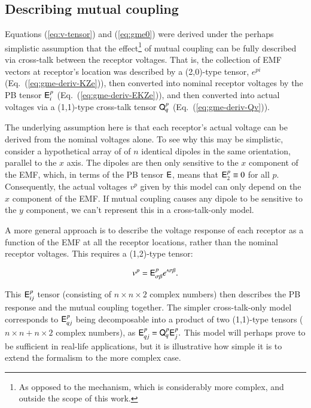\documentclass[]{aa}
\begin{document}
\subsection{Describing mutual coupling}

Equations (\ref{eq:v-tensor}) and (\ref{eq:gme0}) were derived under the perhaps simplistic assumption that the effect\footnote{As opposed
to the mechanism, which is considerably more complex, and outside the scope of this work.} of mutual coupling can be fully described via cross-talk between the receptor voltages. That is, the collection of EMF vectors at receptor's location was described by a (2,0)-type tensor, $e^{pi}$ (Eq.~(\ref{eq:gme-deriv-KZe})), then converted into nominal receptor voltages by the PB tensor $\mathsf{E}^p_i$ (Eq.~(\ref{eq:gme-deriv-EKZe})), and then converted into actual voltages via a (1,1)-type cross-talk tensor $\mathsf{Q}^p_q$ (Eq.~(\ref{eq:gme-deriv-Qv})).

The underlying assumption here is that each receptor's actual voltage can be derived from the nominal voltages alone. To see why this may
be simplistic, consider a hypothetical array of of $n$ identical dipoles in the same orientation, parallel to the
$x$ axis. The dipoles are then only sensitive to the $x$ component of the EMF, which, in terms of the PB tensor $\mathsf{E}$, means that
$\mathsf{E}_{2}^{p}\equiv0$ for all $p$. Consequently, the actual voltages $v^{p}$ given by this model can only depend on the $x$ component of the EMF.
If mutual coupling causes any dipole to be sensitive to the $y$ component, we can't represent this in a cross-talk-only model.

A more general approach is to describe the voltage response of each receptor as a function of the EMF at all the receptor locations, rather than the
nominal receptor voltages. This requires a (1,2)-type tensor:

\[
v^{p}=\mathsf{E}_{\sigma\beta}^{p}e'^{\sigma\beta}.
\label{eq:v-tensor-gen}
\]

This $\mathsf{E}^p_{ij}$ tensor (consisting of $n\times n \times 2$ complex numbers) then describes the PB response and the mutual 
coupling together. The simpler cross-talk-only model corresponds to $\mathsf{E}^p_{qj}$ being decomposable into a product of two
(1,1)-type tensors ($n\times n+ n\times2$ complex numbers), as $\mathsf{E}_{qj}^{p}=\mathsf{Q}_q^p \mathsf{E}_j^p.$ This model will perhaps prove to be sufficient in real-life applications, but it is illustrative how simple it is to extend the formalism to the more complex case.
\end{document}
